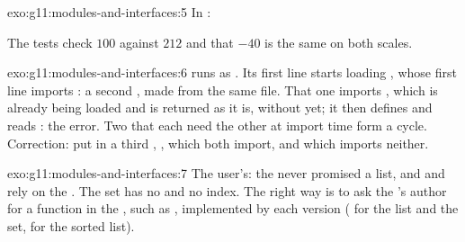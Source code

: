 \begin{solution}{exo:g11:modules-and-interfaces:5}
In :

\smallskip\noindent\hspace*{2em}

\noindent\hspace*{4em}

\noindent\hspace*{4em}

\smallskip\noindent\hspace*{2em}

\noindent\hspace*{4em}

\noindent\hspace*{4em}

\smallskip\noindent The tests check $100$ against $212$ and that $-40$ is the same on both scales.
\end{solution}

\begin{solution}{exo:g11:modules-and-interfaces:6}
 runs  as . Its first line starts loading , whose first
line imports : a second , made from the same file. That one imports , which is already
being loaded and is returned as it is, without  yet; it then defines  and reads
: the error. Two  that each need the other at import time form a cycle. Correction: put
 in a third , , which both import, and which imports neither.
\end{solution}

\begin{solution}{exo:g11:modules-and-interfaces:7}
The user's: the  never promised a list, and  and \code{[0]} rely on the . The set
has no  and no index. The right way is to ask the 's author for a function in the , such as
, implemented by each version ( for the list and the set,  for the sorted
list).
\end{solution}

